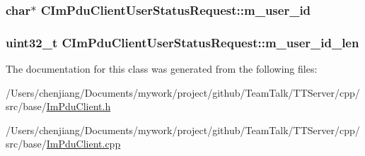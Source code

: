 \subsubsection[{m\+\_\+user\+\_\+id}]{\setlength{\rightskip}{0pt plus 5cm}char$\ast$ C\+Im\+Pdu\+Client\+User\+Status\+Request\+::m\+\_\+user\+\_\+id\hspace{0.3cm}{\ttfamily [private]}}\label{class_c_im_pdu_client_user_status_request_a9be6c26569d0bd2edbcddab9a63202bb}
\hypertarget{class_c_im_pdu_client_user_status_request_a604abb8e62f1f5291d4c2df7ec753f86}{}
\subsubsection[{m\+\_\+user\+\_\+id\+\_\+len}]{\setlength{\rightskip}{0pt plus 5cm}uint32\+\_\+t C\+Im\+Pdu\+Client\+User\+Status\+Request\+::m\+\_\+user\+\_\+id\+\_\+len\hspace{0.3cm}{\ttfamily [private]}}\label{class_c_im_pdu_client_user_status_request_a604abb8e62f1f5291d4c2df7ec753f86}


The documentation for this class was generated from the following files\+:\begin{DoxyCompactItemize}
\item 
/\+Users/chenjiang/\+Documents/mywork/project/github/\+Team\+Talk/\+T\+T\+Server/cpp/src/base/\hyperlink{_im_pdu_client_8h}{Im\+Pdu\+Client.\+h}\item 
/\+Users/chenjiang/\+Documents/mywork/project/github/\+Team\+Talk/\+T\+T\+Server/cpp/src/base/\hyperlink{_im_pdu_client_8cpp}{Im\+Pdu\+Client.\+cpp}\end{DoxyCompactItemize}
